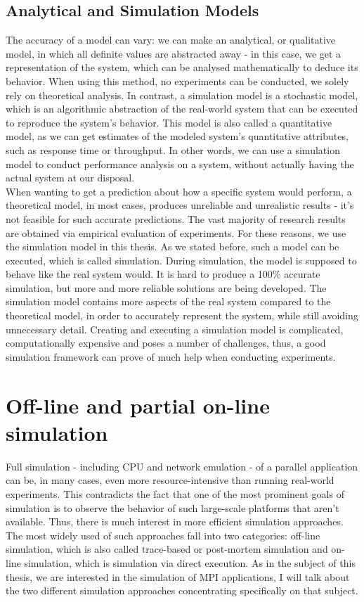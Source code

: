 \subsection{Analytical and Simulation Models}
The accuracy of a model can vary: we can make an analytical, or
qualitative model, in which all definite values are abstracted away -
in this case, we get a representation of
the system, which can be analysed mathematically to deduce its
behavior. When using this method, no experiments can be conducted, we
solely rely on theoretical analysis. In contrast, a simulation model
is a stochastic model, which is an algorithmic abstraction of the
real-world system that can be executed to reproduce the system's
behavior. This model is also called a quantitative model, as we can
get estimates of the modeled system's quantitative attributes, such as
response time or throughput. In other words, we can use a simulation
model to conduct performance analysis on a system, without actually
having the actual system at our disposal.\cite{h12_1}\cite{h12_13}\\
When wanting to get a prediction about how a specific system would
perform, a theoretical model, in most cases, produces unreliable and
unrealistic results - it's not feasible for such accurate
predictions. The vast majority of research results are obtained via
empirical evaluation of experiments.\cite{clq08} For these reasons, we
use the simulation model in this thesis. As we stated before, such a
model can be executed, which is called simulation. During simulation,
the model is supposed to behave like the real system would. It is hard
to produce a 100\% accurate simulation, but more and more reliable
solutions are being developed. The simulation model contains
more aspects of the real system compared to the theoretical model, in
order to accurately represent the system, while still avoiding
unnecessary detail.\cite{h12_1} Creating and executing a simulation
model is complicated, computationally expensive and poses a number of
challenges, thus, a good simulation framework can prove of much help
when conducting experiments.
\section{Off-line and partial on-line simulation}
Full simulation - including CPU and network emulation - of a parallel
application can be, in many cases, even more resource-intensive than
running real-world experiments. This contradicts the fact that one of
the most prominent goals of simulation is to observe the behavior of
such large-scale platforms that aren't available. Thus, there is much
interest in more efficient simulation approaches. \cite{bdglmqssv13}
The most widely used of such approaches fall into two categories:
off-line simulation, which is also called trace-based or post-mortem
simulation and on-line simulation, which is simulation via direct
execution.\cite{csgscq11} As in the subject of this thesis, we are
interested in the simulation of MPI applications, I will talk about
the two different simulation approaches concentrating specifically on
that subject.
